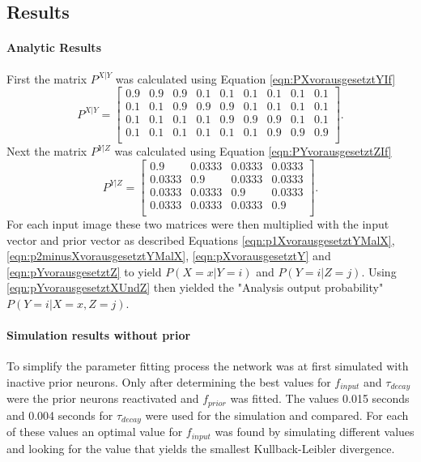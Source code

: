 \subsection{Results}

\paragraph{Analytic Results}

First the matrix $P^{X|Y}$ was calculated using Equation \ref{eqn:PXvorausgesetztYIf} 
\begin{equation}
\label{eqn:pXvorausgesetztYResult}
P^{X|Y} = \begin{bmatrix}
0.9 & 0.9 & 0.9 & 0.1 & 0.1 & 0.1 & 0.1 & 0.1 & 0.1\\
0.1 & 0.1 & 0.9 & 0.9 & 0.9 & 0.1 & 0.1 & 0.1 & 0.1\\
0.1 & 0.1 & 0.1 & 0.1 & 0.9 & 0.9 & 0.9 & 0.1 & 0.1\\
0.1 & 0.1 & 0.1 & 0.1 & 0.1 & 0.1 & 0.9 & 0.9 & 0.9\\
\end{bmatrix}.
\end{equation}
Next the matrix $P^{Y|Z}$ was calculated using Equation \ref{eqn:PYvorausgesetztZIf} 
\begin{equation}
\label{eqn:pYvorausgesetztZResult}
P^{Y|Z} = \begin{bmatrix}
0.9 & 0.0333 & 0.0333 & 0.0333\\
0.0333 & 0.9 & 0.0333 & 0.0333\\
0.0333 & 0.0333 & 0.9 & 0.0333\\
0.0333 & 0.0333 & 0.0333 & 0.9\\
\end{bmatrix}.
\end{equation} 
For each input image these two matrices were then  multiplied with the input vector and prior vector as described Equations \ref{eqn:p1XvorausgesetztYMalX}, \ref{eqn:p2minusXvorausgesetztYMalX},  \ref{eqn:pXvorausgesetztY} and \ref{eqn:pYvorausgesetztZ} to yield $P(X = x|Y = i)$ and $P(Y=i|Z=j)$. Using  \ref{eqn:pYvorausgesetztXUndZ} then 
yielded the "Analysis output probability" $P(Y = i|X = x, Z = j)$.

\paragraph{Simulation results without prior}
To simplify the parameter fitting process the network was at first simulated with inactive prior neurons. Only after determining the best values for $f_{input}$ and $\tau_{decay}$ were the prior neurons reactivated and $f_{prior}$ was fitted. The values 0.015 seconds and 0.004 seconds for $\tau_{decay}$ were used for the simulation and compared. For each of these values an optimal value for $f_{input}$ was found by simulating different values and looking for the value that yields the smallest Kullback-Leibler divergence.

